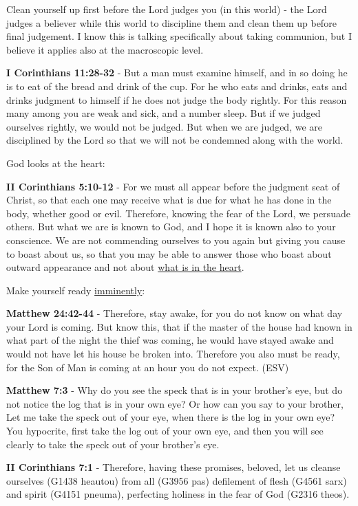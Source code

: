 \documentclass[11pt]{article}
\begin{document}
Clean yourself up first before the Lord judges you (in this world) - the Lord judges a believer while this world to discipline them and clean them up before final judgement.
I know this is talking specifically about taking communion, but I believe it applies also at the macroscopic level.

\textbf{I Corinthians 11:28-32} - But a man must examine himself, and in so doing he is to eat of the bread and drink of the cup.  For he who eats and drinks, eats and drinks judgment to himself if he does not judge the body rightly.  For this reason many among you are weak and sick, and a number sleep.  But if we judged ourselves rightly, we would not be judged.  But when we are judged, we are disciplined by the Lord so that we will not be condemned along with the world.

God looks at the heart:

\textbf{II Corinthians 5:10-12} - For we must all appear before the judgment seat of Christ, so that each one may receive what is due for what he has done in the body, whether good or evil. Therefore, knowing the fear of the Lord, we persuade others. But what we are is known to God, and I hope it is known also to your conscience. We are not commending ourselves to you again but giving you cause to boast about us, so that you may be able to answer those who boast about outward appearance and not about \uline{what is in the heart}.

Make yourself ready \uline{imminently}:

\textbf{Matthew 24:42-44} - Therefore, stay awake, for you do not know on what day your Lord is coming. But know this, that if the master of the house had known in what part of the night the thief was coming, he would have stayed awake and would not have let his house be broken into. Therefore you also must be ready, for the Son of Man is coming at an hour you do not expect. (ESV)

\textbf{Matthew 7:3} - Why do you see the speck that is in your brother's eye, but do not notice the log that is in your own eye?  Or how can you say to your brother, Let me take the speck out of your eye, when there is the log in your own eye?  You hypocrite, first take the log out of your own eye, and then you will see clearly to take the speck out of your brother's eye.

\textbf{II Corinthians 7:1} - Therefore, having these promises, beloved, let us cleanse ourselves (G1438 heautou) from all (G3956 pas) defilement of flesh (G4561 sarx) and spirit (G4151 pneuma), perfecting holiness in the fear of God (G2316 theos).
\end{document}
